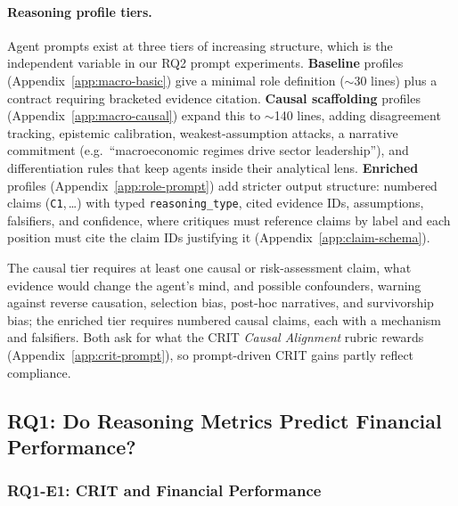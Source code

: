 \documentclass{article}
\begin{document}
\paragraph{Reasoning profile tiers.}
Agent prompts exist at three tiers of increasing structure, which is the independent
variable in our RQ2 prompt experiments. \textbf{Baseline} profiles
(Appendix~\ref{app:macro-basic}) give a minimal role definition ($\sim$30 lines) plus a
contract requiring bracketed evidence citation. \textbf{Causal scaffolding} profiles
(Appendix~\ref{app:macro-causal}) expand this to $\sim$140 lines, adding disagreement
tracking, epistemic calibration, weakest-assumption attacks, a narrative commitment
(e.g.\ ``macroeconomic regimes drive sector leadership''), and differentiation rules that
keep agents inside their analytical lens. \textbf{Enriched} profiles
(Appendix~\ref{app:role-prompt}) add stricter output structure: numbered claims
(\texttt{C1},\,\ldots) with typed \texttt{reasoning\_type}, cited evidence IDs,
assumptions, falsifiers, and confidence, where critiques must reference claims by label
and each position must cite the claim IDs justifying it
(Appendix~\ref{app:claim-schema}).

The causal tier requires at least one causal or risk-assessment claim, what evidence would
change the agent's mind, and possible confounders, warning against reverse causation, selection
bias, post-hoc narratives, and survivorship bias; the enriched tier requires numbered causal claims,
each with a mechanism and falsifiers. Both ask for what the CRIT \textit{Causal Alignment} rubric
rewards (Appendix~\ref{app:crit-prompt}), so prompt-driven CRIT gains partly reflect compliance.



\vspace{-0.2cm}
\subsection{RQ1: Do Reasoning Metrics Predict Financial Performance?}
\vspace{-0.2cm}
\subsubsection{RQ1-E1: CRIT and Financial Performance}
\vspace{-0.2cm}
\end{document}
